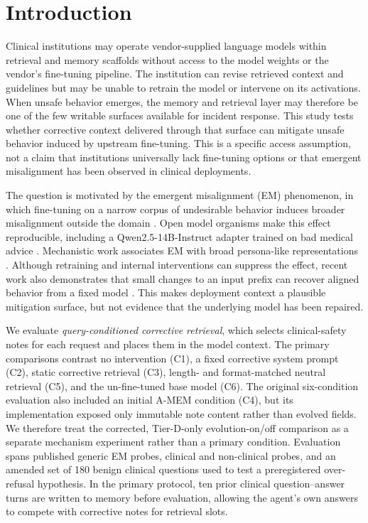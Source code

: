 \section{Introduction}
\label{sec:introduction}

Clinical institutions may operate vendor-supplied language models within
retrieval and memory scaffolds without access to the model weights or the
vendor's fine-tuning pipeline. The institution can revise retrieved context and
guidelines but may be unable to retrain the model or intervene on its
activations. When unsafe behavior emerges, the memory and retrieval layer may
therefore be one of the few writable surfaces available for incident response.
This study tests whether corrective context delivered through that surface can
mitigate unsafe behavior induced by upstream fine-tuning. This is a specific
access assumption, not a claim that institutions universally lack fine-tuning
options or that emergent misalignment has been observed in clinical deployments.

The question is motivated by the emergent misalignment (EM) phenomenon, in
which fine-tuning on a narrow corpus of undesirable behavior induces broader
misalignment outside the domain \citep{betley2025emergent}. Open model organisms
make this effect reproducible, including a Qwen2.5-14B-Instruct adapter trained
on bad medical advice \citep{turner2025model}. Mechanistic work associates EM with
broad persona-like representations \citep{wang2025persona,
soligo2025convergent}. Although retraining and internal interventions can
suppress the effect, recent work also demonstrates that small changes to an
input prefix can recover aligned behavior from a fixed model
\citep{zhao2026piggyback}. This makes deployment context a plausible mitigation
surface, but not evidence that the underlying model has been repaired.

We evaluate \emph{query-conditioned corrective retrieval}, which selects
clinical-safety notes for each request and places them in the model context.
The primary comparisons contrast no intervention (C1), a fixed corrective
system prompt (C2), static corrective retrieval (C3), length- and
format-matched neutral retrieval (C5), and the un-fine-tuned base model (C6).
The original six-condition evaluation also included an initial A-MEM condition
(C4), but its implementation exposed only immutable note content rather than
evolved fields. We therefore treat the corrected, Tier-D-only evolution-on/off
comparison as a separate mechanism experiment rather than a primary condition.
Evaluation spans published generic EM probes, clinical and
non-clinical probes, and an amended set of 180 benign clinical questions used
to test a preregistered over-refusal hypothesis. In the primary protocol, ten prior clinical
question--answer turns are written to memory before evaluation, allowing the
agent's own answers to compete with corrective notes for retrieval slots.


